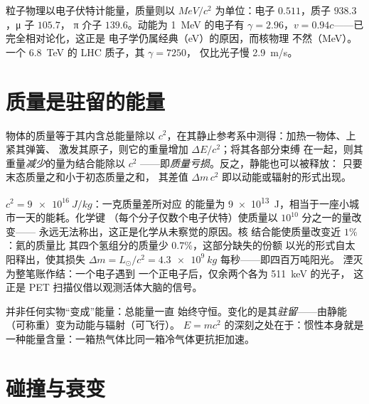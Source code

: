 \begin{example}[数量级]\label{ex:b3:relativistic-dynamics:orders}
粒子物理以电子伏特计能量，质量则以
$\unit{MeV}/c^2$ 为单位：电子 $0.511$，质子 $938.3$，μ 子 $105.7$，
π 介子 $139.6$。动能为 \qty{1}{MeV} 的电子有 $\gamma =
2.96$，$v = 0.94c$——已完全相对论化，这正是
电子学仍属经典（\unit{eV}）的原因，而核物理
不然（\unit{MeV}）。一个 \qty{6.8}{TeV} 的 LHC 质子，其 $\gamma = 7250$，
仅比光子慢 \qty{2.9}{m/s}。
\end{example}

\section{质量是驻留的能量}

\begin{theorem}[质能等价]\label{thm:b3:relativistic-dynamics:emc2}
物体的质量等于其内含总能量除以
$c^2$，在其静止参考系中测得：加热一物体、上紧其弹簧、
激发其原子，则它的重量增加 $\Delta E/c^2$；将其各部分束缚
在一起，则其重量\emph{减少}的量为结合能除以 $c^2$
——即\emph{质量亏损}。反之，静能也可以被释放：
只要末态质量之和小于初态质量之和，
其差值 $\Delta m\,c^2$ 即以动能或辐射的形式出现。
\end{theorem}
\admitted

\begin{example}[$c^2$ 的账目]\label{ex:b3:relativistic-dynamics:ledger}
$c^2 = \qty{9e16}{J/kg}$：一克质量差所对应
的能量为 \qty{9e13}{J}，相当于一座小城市一天的能耗。化学键
（每个分子仅数个电子伏特）使质量以 $10^{10}$ 分之一的量改变——
永远无法称出，这正是化学从未察觉的原因。核
结合能使质量改变近 $1\%$：氦的质量比
其四个氢组分的质量少 $0.7\%$，这部分缺失的份额
以光的形式自太阳释出，使其损失 $\Delta m = L_\odot/c^2 =
\qty{4.3e9}{kg}$ 每秒——即四百万吨阳光。
湮灭为整笔账作结：一个电子遇到
一个正电子后，仅余两个各为 \qty{511}{keV} 的光子，
这正是 PET 扫描仪借以观测活体大脑的信号。
\end{example}

\begin{remark}[“转化”的含义]\label{rem:b3:relativistic-dynamics:conversion}
并非任何实物“变成”能量：总能量一直
始终守恒。变化的是其\emph{驻留}——由静能
（可称重）变为动能与辐射（可飞行）。
$E = mc^2$ 的深刻之处在于：惯性本身就是
一种能量含量：一箱热气体比同一箱冷气体更抗拒加速。
\end{remark}

\section{碰撞与衰变}

